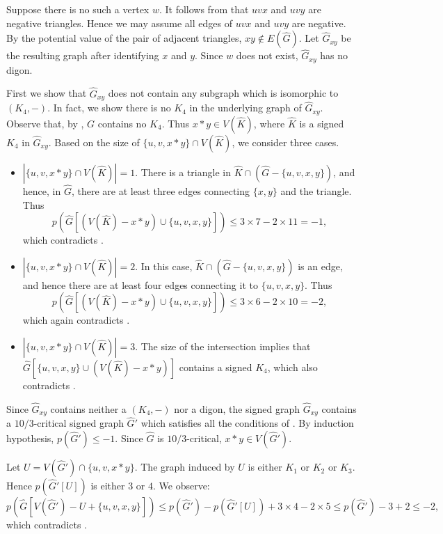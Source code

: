 \documentclass[11pt,a4paper]{article}
\makeatletter
\renewenvironment{proof}[1][\proofname]{\par
	\pushQED{\qed}%
	\normalfont \topsep6\p@\@plus6\p@\relax
	\trivlist
	\item[\hskip\labelsep
	\bfseries
	#1\@addpunct{.}]\ignorespaces
}{%
	\popQED\endtrivlist\@endpefalse
}
\theoremstyle{definition}
\makeatother
\begin{document}
\begin{proof}
	Suppose there is no such a vertex $w$. It follows from  that $uvx$ and $uvy$ are negative triangles. Hence we may assume all edges of $uvx$ and $uvy$ are negative. By the potential value of  the pair of  adjacent triangles, $xy\notin E(\widehat{G})$.   Let $\widehat{G}_{xy}$ be the resulting graph after identifying $x$ and $y$.
	Since $w$ does not exist, $\widehat{G}_{xy}$ has no digon. 
	
	First we show that $\widehat{G}_{xy}$ does not contain any subgraph which is isomorphic to $(K_4,-)$. In fact, we show there is no $K_4$ in the underlying graph of $\widehat{G}_{xy}$. 
	Observe that, by , $G$ contains no $K_4$. Thus $x*y\in V(\widehat{K})$, where $\widehat{K}$ is a signed $K_4$ in $\widehat{G}_{xy}$. Based on the size of $\{u,v ,x*y\}\cap V(\widehat{K})$, we consider three cases.
	
	\begin{itemize}
		\item[(1)] $|\{u, v, x*y\}\cap V(\widehat{K})|=1$.
		There is a  triangle in $\widehat{K}\cap (\widehat{G}-\{u, v, x, y\})$, and hence, in $\widehat{G}$, there are at least three edges connecting $\{x,y\}$ and the triangle. Thus 
		$$p(\widehat{G}[(V(\widehat{K})-x*y)\cup \{u, v, x, y\}])\leq 3\times 7-2\times 11=-1,$$ which  contradicts   .
		
		\item[(2)]  $|\{u, v, x*y\}\cap V(\widehat{K})|=2$. 
		In this case, $\widehat{K}\cap (\widehat{G}-\{u, v, x, y\})$ is an edge, and hence there are at least four edges connecting it to $\{u,v, x,y\}$. Thus
		$$p(\widehat{G}[(V(\widehat{K})-x*y)\cup \{u, v, x, y\}])\leq 3\times 6-2\times 10=-2,$$ which again contradicts  .
		\item[(3)] $|\{u, v, x*y\}\cap V(\widehat{K})|=3$.
		The size of the intersection implies that $\widehat{G}[\{u, v, x, y\}\cup (V(\widehat{K})-x*y)]$ contains a signed $K_4$, which also contradicts  .
	\end{itemize}
	
	Since $\widehat{G}_{xy}$ contains neither a $(K_4,-)$ nor a digon, the signed graph $\widehat{G}_{xy}$ contains a $10/3$-critical signed graph $\widehat{G}'$ which satisfies all the conditions of . By induction hypothesis, $p(\widehat{G}')\leq -1$. Since $\widehat{G}$ is $10/3$-critical,  $x*y\in V(\widehat{G}')$. 
	
	Let $U=V(\widehat{G}')\cap \{u,v,x*y\}$. The graph induced by $U$ is either $K_1$ or $K_2$ or $K_3$. Hence $p(\widehat{G}'[U])$  is either $3$ or $4$. We observe: $$p(\widehat{G}[V(\widehat{G}')-U+\{u,v,x,y\}])\leq p(\widehat{G}')-p(\widehat{G}'[U])+3\times 4-2\times 5 \leq p(\widehat{G}')-3+2\leq -2, $$
	which contradicts . 
\end{proof}
\end{document}
